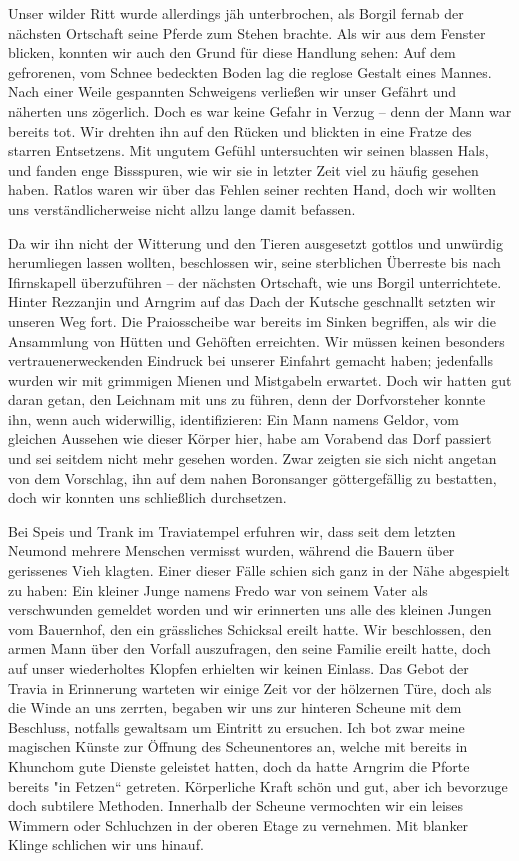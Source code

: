 \documentclass[11pt]{scrreprt}
\begin{document}
Unser wilder Ritt wurde allerdings jäh unterbrochen, als Borgil fernab der nächsten Ortschaft seine Pferde zum Stehen brachte. Als wir aus dem Fenster blicken, konnten wir auch den Grund für diese Handlung sehen: Auf dem gefrorenen, vom Schnee bedeckten Boden lag die reglose Gestalt eines Mannes. Nach einer Weile gespannten Schweigens verließen wir unser Gefährt und näherten uns zögerlich. Doch es war keine Gefahr in Verzug – denn der Mann war bereits tot. Wir drehten ihn auf den Rücken und blickten in eine Fratze des starren Entsetzens. Mit ungutem Gefühl untersuchten wir seinen blassen Hals, und fanden enge Bissspuren, wie wir sie in letzter Zeit viel zu häufig gesehen haben. Ratlos waren wir über das Fehlen seiner rechten Hand, doch wir wollten uns verständlicherweise nicht allzu lange damit befassen. \par

Da wir ihn nicht der Witterung und den Tieren ausgesetzt gottlos und unwürdig herumliegen lassen wollten, beschlossen wir, seine sterblichen Überreste bis nach Ifirnskapell überzuführen – der nächsten Ortschaft, wie uns Borgil unterrichtete. Hinter Rezzanjin und Arngrim auf das Dach der Kutsche geschnallt setzten wir unseren Weg fort. Die Praiosscheibe war bereits im Sinken begriffen, als wir die Ansammlung von Hütten und Gehöften erreichten. Wir müssen keinen besonders vertrauenerweckenden Eindruck bei unserer Einfahrt gemacht haben; jedenfalls wurden wir mit grimmigen Mienen und Mistgabeln erwartet. Doch wir hatten gut daran getan, den Leichnam mit uns zu führen, denn der Dorfvorsteher konnte ihn, wenn auch widerwillig, identifizieren: Ein Mann namens Geldor, vom gleichen Aussehen wie dieser Körper hier, habe am Vorabend das Dorf passiert und sei seitdem nicht mehr gesehen worden. Zwar zeigten sie sich nicht angetan von dem Vorschlag, ihn auf dem nahen Boronsanger göttergefällig zu bestatten, doch wir konnten uns schließlich durchsetzen.\par

Bei Speis und Trank im Traviatempel erfuhren wir, dass seit dem letzten Neumond mehrere Menschen vermisst wurden, während die Bauern über gerissenes Vieh klagten. Einer dieser Fälle schien sich ganz in der Nähe abgespielt zu haben: Ein kleiner Junge namens Fredo war von seinem Vater als verschwunden gemeldet worden und wir erinnerten uns alle des kleinen Jungen vom Bauernhof, den ein grässliches Schicksal ereilt hatte. Wir beschlossen, den armen Mann über den Vorfall auszufragen, den seine Familie ereilt hatte, doch auf unser wiederholtes Klopfen erhielten wir keinen Einlass. Das Gebot der Travia in Erinnerung warteten wir einige Zeit vor der hölzernen Türe, doch als die Winde an uns zerrten, begaben wir uns zur hinteren Scheune mit dem Beschluss, notfalls gewaltsam um Eintritt zu ersuchen. Ich bot zwar meine magischen Künste zur Öffnung des Scheunentores an, welche mit bereits in Khunchom gute Dienste geleistet hatten, doch da hatte Arngrim die Pforte bereits "in Fetzen“ getreten. Körperliche Kraft schön und gut, aber ich bevorzuge doch subtilere Methoden. Innerhalb der Scheune vermochten wir ein leises Wimmern oder Schluchzen in der oberen Etage zu vernehmen. Mit blanker Klinge schlichen wir uns hinauf. \par
\end{document}
